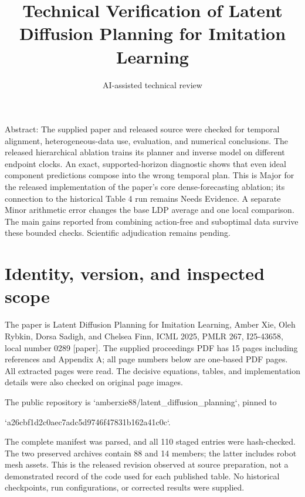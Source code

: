 \documentclass[10pt]{article}
\title{Technical Verification of
Latent Diffusion Planning for Imitation Learning}
\author{AI-assisted technical review}
\date{}
\begin{document}
\maketitle
Abstract: The supplied paper and released source were checked for temporal alignment, heterogeneous-data use, evaluation, and numerical conclusions. The released hierarchical ablation trains its planner and inverse model on different endpoint clocks. An exact, supported-horizon diagnostic shows that even ideal component predictions compose into the wrong temporal plan. This is Major for the released implementation of the paper’s core dense-forecasting ablation; its connection to the historical Table 4 run remains Needs Evidence. A separate Minor arithmetic error changes the base LDP average and one local comparison. The main gains reported from combining action-free and suboptimal data survive these bounded checks. Scientific adjudication remains pending.\par
\section*{Identity, version, and inspected scope}
The paper is Latent Diffusion Planning for Imitation Learning, Amber Xie, Oleh Rybkin, Dorsa Sadigh, and Chelsea Finn, ICML 2025, PMLR 267, I25-43658, local number 0289 [paper]. The supplied proceedings PDF has 15 pages including references and Appendix A; all page numbers below are one-based PDF pages. All extracted pages were read. The decisive equations, tables, and implementation details were also checked on original page images.\par
The public repository is `amberxie88/latent\_diffusion\_planning`, pinned to\par
`a26cbf1d2c0aec7adc5d9746f47831b162a41c0c`.\par
The complete manifest was parsed, and all 110 staged entries were hash-checked. The two preserved archives contain 88 and 14 members; the latter includes robot mesh assets. This is the released revision observed at source preparation, not a demonstrated record of the code used for each published table. No historical checkpoints, run configurations, or corrected results were supplied.\par
\end{document}
